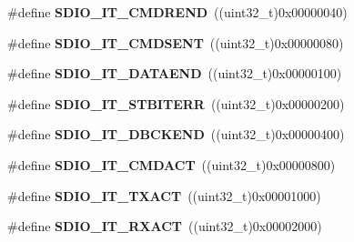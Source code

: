 \begin{DoxyCompactItemize}
\item 
\hypertarget{group___s_d_i_o___interrupt__sources_ga6df3bb694dc00e250cd22e16a03d6910}{}\#define {\bfseries S\+D\+I\+O\+\_\+\+I\+T\+\_\+\+C\+M\+D\+R\+E\+N\+D}~((uint32\+\_\+t)0x00000040)\label{group___s_d_i_o___interrupt__sources_ga6df3bb694dc00e250cd22e16a03d6910}

\item 
\hypertarget{group___s_d_i_o___interrupt__sources_gaf9d8fc4651c4b7555fb9ee4e5af6ca63}{}\#define {\bfseries S\+D\+I\+O\+\_\+\+I\+T\+\_\+\+C\+M\+D\+S\+E\+N\+T}~((uint32\+\_\+t)0x00000080)\label{group___s_d_i_o___interrupt__sources_gaf9d8fc4651c4b7555fb9ee4e5af6ca63}

\item 
\hypertarget{group___s_d_i_o___interrupt__sources_ga6cc1c521b64fc57b844336f7f175dd1e}{}\#define {\bfseries S\+D\+I\+O\+\_\+\+I\+T\+\_\+\+D\+A\+T\+A\+E\+N\+D}~((uint32\+\_\+t)0x00000100)\label{group___s_d_i_o___interrupt__sources_ga6cc1c521b64fc57b844336f7f175dd1e}

\item 
\hypertarget{group___s_d_i_o___interrupt__sources_ga55f7e65ed1b70d5a6abdc3cc41b55766}{}\#define {\bfseries S\+D\+I\+O\+\_\+\+I\+T\+\_\+\+S\+T\+B\+I\+T\+E\+R\+R}~((uint32\+\_\+t)0x00000200)\label{group___s_d_i_o___interrupt__sources_ga55f7e65ed1b70d5a6abdc3cc41b55766}

\item 
\hypertarget{group___s_d_i_o___interrupt__sources_gaa1b1fb453a3ce3b10928aaeada2b2186}{}\#define {\bfseries S\+D\+I\+O\+\_\+\+I\+T\+\_\+\+D\+B\+C\+K\+E\+N\+D}~((uint32\+\_\+t)0x00000400)\label{group___s_d_i_o___interrupt__sources_gaa1b1fb453a3ce3b10928aaeada2b2186}

\item 
\hypertarget{group___s_d_i_o___interrupt__sources_gae73ae9bc72eaeedc2a37221697bc33e2}{}\#define {\bfseries S\+D\+I\+O\+\_\+\+I\+T\+\_\+\+C\+M\+D\+A\+C\+T}~((uint32\+\_\+t)0x00000800)\label{group___s_d_i_o___interrupt__sources_gae73ae9bc72eaeedc2a37221697bc33e2}

\item 
\hypertarget{group___s_d_i_o___interrupt__sources_ga811e683588ab887abb0101defafdb51e}{}\#define {\bfseries S\+D\+I\+O\+\_\+\+I\+T\+\_\+\+T\+X\+A\+C\+T}~((uint32\+\_\+t)0x00001000)\label{group___s_d_i_o___interrupt__sources_ga811e683588ab887abb0101defafdb51e}

\item 
\hypertarget{group___s_d_i_o___interrupt__sources_ga1d9a59a2415b57bdf9827423cb6ce3a0}{}\#define {\bfseries S\+D\+I\+O\+\_\+\+I\+T\+\_\+\+R\+X\+A\+C\+T}~((uint32\+\_\+t)0x00002000)\label{group___s_d_i_o___interrupt__sources_ga1d9a59a2415b57bdf9827423cb6ce3a0}


\end{DoxyCompactItemize}
